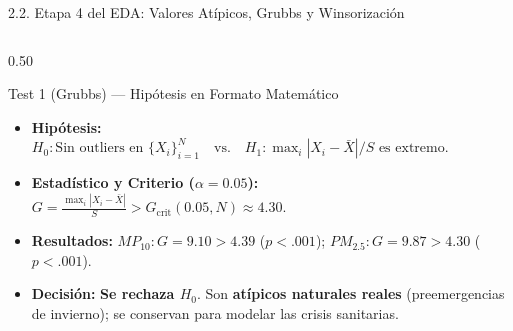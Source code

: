 \documentclass[aspectratio=169, 9pt]{beamer}
\begin{document}
\begin{frame}{2.2. Etapa 4 del EDA: Valores Atípicos, Grubbs y Winsorización}
\begin{columns}[T]
\begin{column}{0.50\textwidth}
    \begin{exampleblock}{\footnotesize Test 1 (Grubbs) — Hipótesis en Formato Matemático}
      \scriptsize
      \begin{itemize}\setlength{\itemsep}{1pt}
        \item \textbf{Hipótesis:} $H_0: \text{Sin outliers en } \{X_i\}_{i=1}^N \quad \text{vs.} \quad H_1: \max_i |X_i - \bar{X}|/S \text{ es extremo}$.
        \item \textbf{Estadístico y Criterio ($\alpha=0.05$):} $G = \frac{\max_i |X_i - \bar{X}|}{S} > G_{\text{crit}}(0.05, N) \approx 4.30$.
        \item \textbf{Resultados:} $MP_{10}: G = \mathbf{9.10} > 4.39$ ($p<.001$); $PM_{2.5}: G = \mathbf{9.87} > 4.30$ ($p<.001$).
        \item \textbf{Decisión:} \textbf{Se rechaza $H_0$}. Son \textbf{atípicos naturales reales} (preemergencias de invierno); se conservan para modelar las crisis sanitarias.
      \end{itemize}
    \end{exampleblock}
  \end{column}
\end{columns}
\end{frame}
\end{document}
